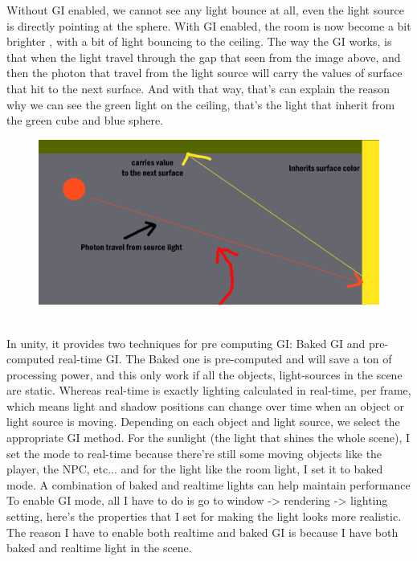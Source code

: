 \documentclass[a4paper, 13pt]{extarticle}
\begin{document}
{\begin{figure}[h]
 \end{figure}
 Without GI enabled, we cannot see any light bounce at all, even the light source is directly pointing at the sphere. With GI enabled, the room is now become a bit brighter , with a bit of light bouncing to the ceiling. The way the GI works, is that when the light travel through the gap that seen from the image above, and then the photon that travel from the light source will carry the values of surface that hit to the next surface. And with that way, that's can explain the reason why we can see the green light on the ceiling, that's the light that inherit from the green cube and blue sphere. 
  \begin{figure}[h]
 	\begin{minipage}{1\textwidth}
 		\centering
 		\includegraphics[width=0.8\linewidth]{intructions/How_light_works.png}
 		\centering
 	\end{minipage}
 \end{figure}
\\[0.05cm]
 In unity, it provides two techniques for pre computing GI: Baked GI and pre-computed real-time GI. The Baked one is pre-computed and will save a ton of processing power, and this only work if all the objects, light-sources in the scene are static. Whereas real-time is exactly lighting calculated in real-time, per frame, which means light and shadow positions can change over time when an object or light source is moving. Depending on each object and light source, we select the appropriate GI method. For the sunlight (the light that shines the whole scene), I set the mode to real-time because there're still some moving objects like the player, the NPC, etc... and for the light like the room light, I set it to baked mode. A combination of baked and realtime lights can help maintain performance
 To enable GI mode, all I have to do is go to window -> rendering -> lighting setting, here's the properties that I set for making the light looks more realistic. The reason I have to enable both realtime and baked GI is because I have both baked and realtime light in the scene.
}
\end{document}
